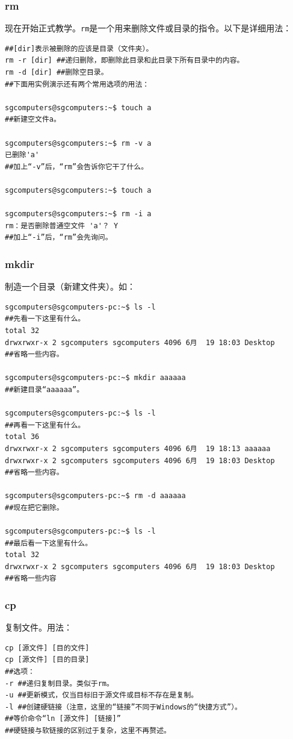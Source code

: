 \subsubsection{rm}
{\color{red}{警告！这是一个删除命令！这个命令的不正确操作可能会对操作系统产生不可逆的致命破坏！如果可行，请使用图形界面！}}\par
\cite{manrm} 现在开始正式教学。\verb|rm|是一个用来删除文件或目录的指令。以下是详细用法：
\begin{verbatim}
##[dir]表示被删除的应该是目录（文件夹）。
rm -r [dir] ##递归删除，即删除此目录和此目录下所有目录中的内容。
rm -d [dir] ##删除空目录。
##下面用实例演示还有两个常用选项的用法：

sgcomputers@sgcomputers:~$ touch a
##新建空文件a。

sgcomputers@sgcomputers:~$ rm -v a
已删除'a'
##加上“-v”后，“rm”会告诉你它干了什么。

sgcomputers@sgcomputers:~$ touch a

sgcomputers@sgcomputers:~$ rm -i a
rm：是否删除普通空文件 'a'？ Y
##加上“-i”后，“rm”会先询问。

\end{verbatim}
\subsubsection{mkdir}
制造一个目录（新建文件夹）。如：
\begin{verbatim}
sgcomputers@sgcomputers-pc:~$ ls -l
##先看一下这里有什么。
total 32
drwxrwxr-x 2 sgcomputers sgcomputers 4096 6月  19 18:03 Desktop
##省略一些内容。

sgcomputers@sgcomputers-pc:~$ mkdir aaaaaa
##新建目录“aaaaaa”。

sgcomputers@sgcomputers-pc:~$ ls -l
##再看一下这里有什么。
total 36
drwxrwxr-x 2 sgcomputers sgcomputers 4096 6月  19 18:13 aaaaaa
drwxrwxr-x 2 sgcomputers sgcomputers 4096 6月  19 18:03 Desktop
##省略一些内容。

sgcomputers@sgcomputers-pc:~$ rm -d aaaaaa
##现在把它删除。

sgcomputers@sgcomputers-pc:~$ ls -l
##最后看一下这里有什么。
total 32
drwxrwxr-x 2 sgcomputers sgcomputers 4096 6月  19 18:03 Desktop
##省略一些内容
\end{verbatim}
\subsubsection{cp}
复制文件。用法：
\begin{verbatim}
cp [源文件] [目的文件]
cp [源文件] [目的目录]
##选项：
-r ##递归复制目录。类似于rm。
-u ##更新模式，仅当目标旧于源文件或目标不存在是复制。
-l ##创建硬链接（注意，这里的“链接”不同于Windows的“快捷方式”）。
##等价命令“ln [源文件] [链接]”
##硬链接与软链接的区别过于复杂，这里不再赘述。
\end{verbatim}
